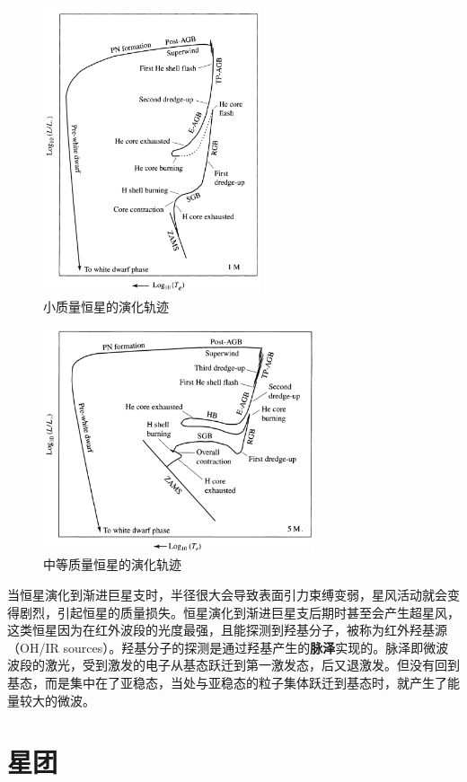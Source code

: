 \documentclass[openany]{ctexbook}
\begin{document}
\begin{figure}[hbt]
  \centering
  \includegraphics[width=6.4cm]{chapters/13/lowmass}
  \caption{小质量恒星的演化轨迹}
  \label{}
\end{figure}

\begin{figure}[hbt]
  \centering
  \includegraphics[width=8cm]{chapters/13/intermediate}
  \caption{中等质量恒星的演化轨迹}
  \label{}
\end{figure}

当恒星演化到渐进巨星支时，半径很大会导致表面引力束缚变弱，星风活动就会变得剧烈，引起恒星的质量损失。恒星演化到渐进巨星支后期时甚至会产生超星风，这类恒星因为在红外波段的光度最强，且能探测到羟基分子，被称为红外羟基源（OH/IR sources）。羟基分子的探测是通过羟基产生的\textbf{脉泽}实现的。脉泽即微波波段的激光，受到激发的电子从基态跃迁到第一激发态，后又退激发。但没有回到基态，而是集中在了亚稳态，当处与亚稳态的粒子集体跃迁到基态时，就产生了能量较大的微波。


\section{星团}
\end{document}
